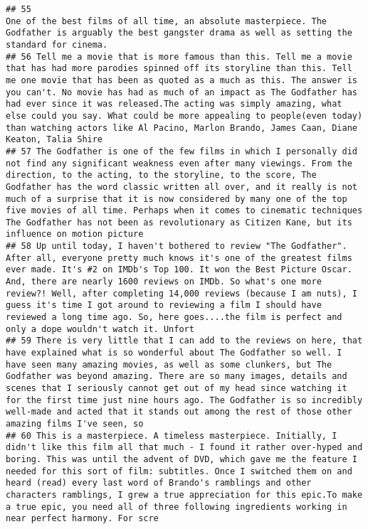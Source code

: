 \documentclass[
]{article}
\begin{document}
\begin{verbatim}
## 55                                                                                                                                                                                                                                                                                                                                                            One of the best films of all time, an absolute masterpiece. The Godfather is arguably the best gangster drama as well as setting the standard for cinema.
## 56 Tell me a movie that is more famous than this. Tell me a movie that has had more parodies spinned off its storyline than this. Tell me one movie that has been as quoted as a much as this. The answer is you can't. No movie has had as much of an impact as The Godfather has had ever since it was released.The acting was simply amazing, what else could you say. What could be more appealing to people(even today) than watching actors like Al Pacino, Marlon Brando, James Caan, Diane Keaton, Talia Shire 
## 57 The Godfather is one of the few films in which I personally did not find any significant weakness even after many viewings. From the direction, to the acting, to the storyline, to the score, The Godfather has the word classic written all over, and it really is not much of a surprise that it is now considered by many one of the top five movies of all time. Perhaps when it comes to cinematic techniques The Godfather has not been as revolutionary as Citizen Kane, but its influence on motion picture
## 58 Up until today, I haven't bothered to review "The Godfather". After all, everyone pretty much knows it's one of the greatest films ever made. It's #2 on IMDb's Top 100. It won the Best Picture Oscar. And, there are nearly 1600 reviews on IMDb. So what's one more review?! Well, after completing 14,000 reviews (because I am nuts), I guess it's time I got around to reviewing a film I should have reviewed a long time ago. So, here goes....the film is perfect and only a dope wouldn't watch it. Unfort
## 59 There is very little that I can add to the reviews on here, that have explained what is so wonderful about The Godfather so well. I have seen many amazing movies, as well as some clunkers, but The Godfather was beyond amazing. There are so many images, details and scenes that I seriously cannot get out of my head since watching it for the first time just nine hours ago. The Godfather is so incredibly well-made and acted that it stands out among the rest of those other amazing films I've seen, so
## 60 This is a masterpiece. A timeless masterpiece. Initially, I didn't like this film all that much - I found it rather over-hyped and boring. This was until the advent of DVD, which gave me the feature I needed for this sort of film: subtitles. Once I switched them on and heard (read) every last word of Brando's ramblings and other characters ramblings, I grew a true appreciation for this epic.To make a true epic, you need all of three following ingredients working in near perfect harmony. For scre

\end{verbatim}
\end{document}
